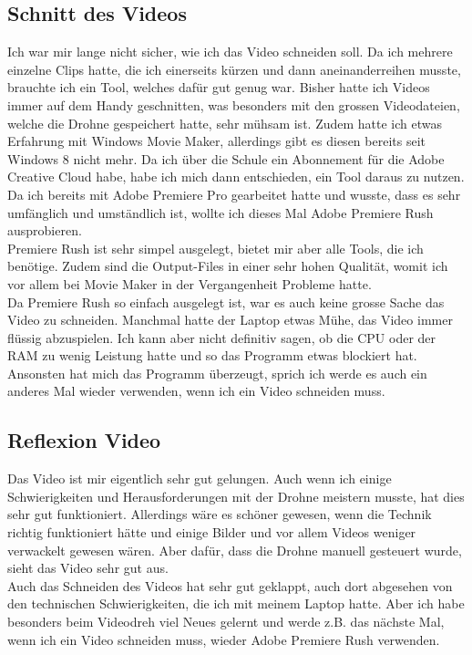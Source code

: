 \documentclass[11pt]{article}
\begin{document}
    \subsection{Schnitt des Videos}
    Ich war mir lange nicht sicher, wie ich das Video schneiden soll. Da ich mehrere einzelne Clips hatte, die ich einerseits kürzen und dann
    aneinanderreihen musste, brauchte ich ein Tool, welches dafür gut genug war. Bisher hatte ich Videos immer auf dem Handy geschnitten, was
    besonders mit den grossen Videodateien, welche die Drohne gespeichert hatte, sehr mühsam ist. Zudem hatte ich etwas Erfahrung mit Windows
    Movie Maker, allerdings gibt es diesen bereits seit Windows 8 nicht mehr. Da ich über die Schule ein Abonnement für die Adobe Creative Cloud
    habe, habe ich mich dann entschieden, ein Tool daraus zu nutzen. Da ich bereits mit Adobe Premiere Pro gearbeitet hatte und wusste, dass
    es sehr umfänglich und umständlich ist, wollte ich dieses Mal Adobe Premiere Rush ausprobieren.\\
    Premiere Rush ist sehr simpel ausgelegt, bietet mir aber alle Tools, die ich benötige. Zudem sind die Output-Files in einer sehr hohen
    Qualität, womit ich vor allem bei Movie Maker in der Vergangenheit Probleme hatte.\\
    Da Premiere Rush so einfach ausgelegt ist, war es auch keine grosse Sache das Video zu schneiden. Manchmal hatte der Laptop etwas Mühe,
    das Video immer flüssig abzuspielen. Ich kann aber nicht definitiv sagen, ob die CPU oder der RAM zu wenig Leistung hatte und so das Programm
    etwas blockiert hat.\\
    Ansonsten hat mich das Programm überzeugt, sprich ich werde es auch ein anderes Mal wieder verwenden, wenn ich ein Video schneiden muss.

    \subsection{Reflexion Video}
    Das Video ist mir eigentlich sehr gut gelungen. Auch wenn ich einige Schwierigkeiten und Herausforderungen mit der Drohne meistern musste,
    hat dies sehr gut funktioniert. Allerdings wäre es schöner gewesen, wenn die Technik richtig funktioniert hätte und einige Bilder und vor allem
    Videos weniger verwackelt gewesen wären. Aber dafür, dass die Drohne manuell gesteuert wurde, sieht das Video sehr gut aus.\\
    Auch das Schneiden des Videos hat sehr gut geklappt, auch dort abgesehen von den technischen Schwierigkeiten, die ich mit meinem Laptop hatte.
    Aber ich habe besonders beim Videodreh viel Neues gelernt und werde z.B. das nächste Mal, wenn ich ein Video schneiden muss, wieder Adobe
    Premiere Rush verwenden.
\end{document}

